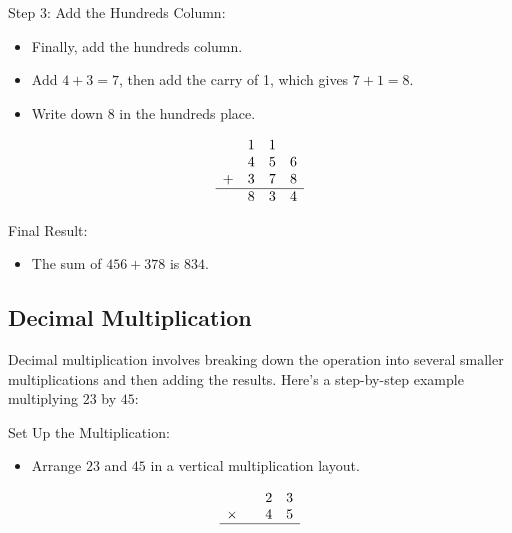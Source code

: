 \vspace{\baselineskip}\par
Step 3: Add the Hundreds Column:
  \begin{itemize}
       \item Finally, add the hundreds column.
       \item Add \( 4 + 3 = 7 \), then add the carry of 1, which gives \( 7 + 1 = 8 \).
       \item Write down 8 in the hundreds place.
   \end{itemize}
\[
\begin{array}{cccc}
    & 1 & 1 & \\ %
    & 4 & 5 & 6 \\
  + & 3 & 7 & 8 \\
  \hline
    & 8 & 3 & 4 \\
\end{array}
\]

\vspace{\baselineskip}\par
Final Result:
  \begin{itemize}
       \item The sum of \( 456 + 378 \) is \( 834 \).
   \end{itemize}



\subsection{Decimal Multiplication}
Decimal multiplication involves breaking down the operation into several smaller multiplications and then adding the results. Here’s a step-by-step example multiplying \( 23 \) by \( 45 \):

\vspace{\baselineskip}\par
Set Up the Multiplication:
  \begin{itemize}
    \item Arrange \( 23 \) and \( 45 \) in a vertical multiplication layout.
   \end{itemize}
\[
\begin{array}{rcccc}
    & & 2 & 3 \\ %
  \times & & 4 & 5 \\ %
  \hline
\end{array}
\]

